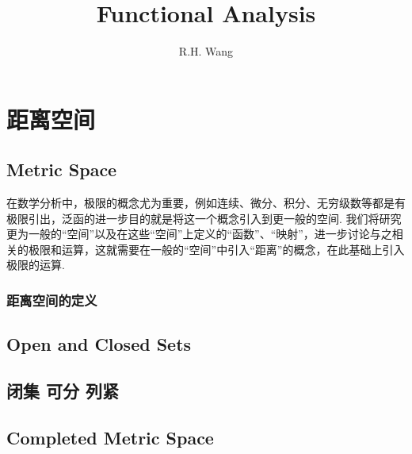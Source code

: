 \documentclass[UTF8,12pt,AutoFakeBold]{ctexbook}
\title{Functional Analysis}
\author{R.H. Wang}
\date{}
\numberwithin{equation}{section}%
\begin{document}
	\kaishu
	\maketitle
	
	\vspace{1cm}
	\tableofcontents
	
	\newpage
	\kaishu
	\chapter{距离空间}
	\section{Metric Space}
	在数学分析中，极限的概念尤为重要，例如连续、微分、积分、无穷级数等都是有极限引出，泛函的进一步目的就是将这一个概念引入到更一般的空间. 我们将研究更为一般的“空间”以及在这些“空间”上定义的“函数”、“映射”，进一步讨论与之相关的极限和运算，这就需要在一般的“空间”中引入“距离”的概念，{\color{brown}在此基础上引入极限的运算}.
	
	
	
	\subsection{距离空间的定义}
	
	
	
	\section{Open and Closed Sets}

	\section{闭集 可分 列紧}
	
	\section{Completed Metric Space}
	
	
	
	
	
	\newpage
		

	
\end{document}
